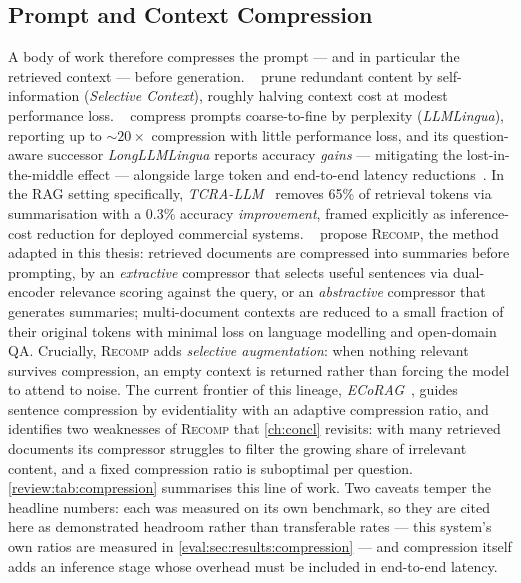 \subsection{Prompt and Context Compression}
\label{review:subsec:compression}

A body of work therefore compresses the prompt --- and in particular the
retrieved context --- before generation. \citet{emnlp23:Li}~\cite{emnlp23:Li}
prune redundant content by self-information (\emph{Selective Context}),
roughly halving context cost at modest performance loss.
\citet{emnlp23:Jiang}~\cite{emnlp23:Jiang} compress prompts coarse-to-fine by
perplexity (\emph{LLMLingua}), reporting up to ${\sim}20\times$ compression
with little performance loss, and its question-aware successor
\emph{LongLLMLingua} reports accuracy \emph{gains} --- mitigating the
lost-in-the-middle effect --- alongside large token and end-to-end latency
reductions~\cite{acl24:Jiang}. In the RAG setting specifically,
\emph{TCRA-LLM}~\cite{femnlp23:Liu} removes 65\% of retrieval tokens via
summarisation with a 0.3\% accuracy \emph{improvement}, framed explicitly as
inference-cost reduction for deployed commercial systems.
\citet{iclr24:Xu}~\cite{iclr24:Xu} propose \textsc{Recomp}, the method
adapted in this thesis: retrieved documents are compressed into summaries
before prompting, by an \emph{extractive} compressor that selects useful
sentences via dual-encoder relevance scoring against the query, or an
\emph{abstractive} compressor that generates summaries; multi-document
contexts are reduced to a small fraction of their original tokens with
minimal loss on language modelling and open-domain QA. Crucially,
\textsc{Recomp} adds \emph{selective augmentation}: when nothing relevant
survives compression, an empty context is returned rather than forcing the
model to attend to noise. The current frontier of this lineage,
\emph{ECoRAG}~\cite{facl25:Jeong}, guides sentence compression by
evidentiality with an adaptive compression ratio, and identifies two
weaknesses of \textsc{Recomp} that \autoref{ch:concl} revisits: with many
retrieved documents its compressor struggles to filter the growing share of
irrelevant content, and a fixed compression ratio is suboptimal per question.
\autoref{review:tab:compression} summarises this line of work. Two caveats
temper the headline numbers: each was measured on its own benchmark, so they
are cited here as demonstrated headroom rather than transferable rates ---
this system's own ratios are measured in
\autoref{eval:sec:results:compression} --- and compression itself adds an
inference stage whose overhead must be included in end-to-end latency.

